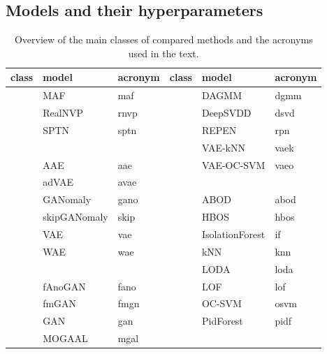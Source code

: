 \subsection{Models and their hyperparameters} \label{sec:hyperparameteroptimization}
\begin{table}
    \centering
    \tabcolsep=0.1cm
    
    \begin{tabular}{cll|cll}
    \toprule
    \textbf{class} & \textbf{model} & \textbf{acronym} & \textbf{class} & \textbf{model} & \textbf{acronym}  \\\midrule
    
    \parbox[t]{2mm}{} & MAF & maf & \parbox[t]{2mm}{} & DAGMM & dgmm \\
        & RealNVP & rnvp & & DeepSVDD & dsvd \\
        & SPTN & sptn & & REPEN & rpn  \\
        & & & & VAE-kNN & vaek \\

    \parbox[t]{2mm}{} 
        & AAE & aae & & VAE-OC-SVM & vaeo \\
        & adVAE & avae & & & \\

        & GANomaly & gano & \parbox[t]{2mm}{} & ABOD & abod \\

        & skipGANomaly & skip & & HBOS & hbos \\
        & VAE & vae & & IsolationForest & if \\
        & WAE & wae & & kNN & knn \\
        & & & & LODA & loda \\
    \parbox[t]{2mm}{}
        & fAnoGAN & fano & & LOF & lof \\ 
        & fmGAN & fmgn & & OC-SVM & osvm \\
        & GAN & gan & & PidForest & pidf \\
        & MOGAAL & mgal & \\
    
    \bottomrule
    \end{tabular}

    \vspace*{0.15cm}
    \caption{Overview of the main classes of compared methods and the acronyms used in the text.}
    \label{tab:model_acronyms_2col}
\end{table}

